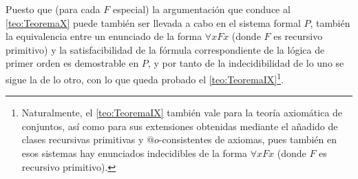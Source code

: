 Puesto que (para cada $F$ especial) la argumentación que conduce al \autoref{teo:TeoremaX} puede también ser llevada a cabo en el sistema formal $P$, también la equivalencia 
entre un enunciado de la forma $\forall x F x$ (donde $F$ es recursivo primitivo) y la satisfacibilidad de la fórmula correspondiente de la lógica de primer orden es demostrable en $P$, 
y por tanto de la indecidibilidad de lo uno se sigue la de lo otro, con lo que queda probado el \autoref{teo:TeoremaIX}\footnote{Naturalmente, el \autoref{teo:TeoremaIX} también vale 
para la teoría axiomática de conjuntos, así como para sus extensiones obtenidas mediante el añadido de clases recursivas primitivas y $@o$-consistentes de axiomas, pues también en esos
sistemas hay enunciados indecidibles de la forma $\forall xFx$ (donde $F$ es recursivo primitivo).}.


\endinput

